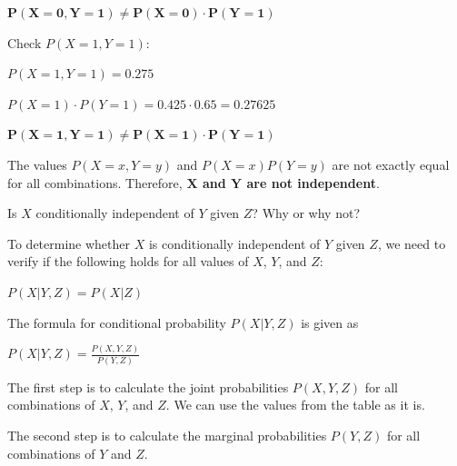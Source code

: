 \documentclass[12pt,letterpaper, onecolumn]{exam}
\begin{document}
\begin{questions}
\begin{parts}
\begin{subparts}
\begin{solution}
\begin{center}
                    $\boldsymbol{P(X=0,Y=1) \neq P(X=0) \cdot P(Y=1)}$
                \end{center}

                Check $P(X=1,Y=1)$:

                \begin{center}
                    $P(X=1,Y=1) = 0.275$

                    $P(X=1) \cdot P(Y=1) = 0.425 \cdot 0.65 = 0.27625$

                    $\boldsymbol{P(X=1,Y=1) \neq P(X=1) \cdot P(Y=1)}$
                \end{center}

                The values $P(X=x,Y=y)$ and $P(X=x)P(Y=y)$ are not exactly equal for all combinations. 
                Therefore, \textbf{$\boldsymbol{X}$ and $\textbf{Y}$ are not independent}.
                
            \end{solution}

            \pagebreak

            \subpart[5]
            Is $X$ conditionally independent of $Y$ given $Z$? Why or why not?
    
            \begin{solution}
                To determine whether $X$ is conditionally independent of $Y$ given 
                $Z$, we need to verify if the following holds for all values of 
                $X$, $Y$, and $Z$:
                
                \begin{center}
                    $\displaystyle{P(X|Y,Z) = P(X|Z)}$
                \end{center}

                The formula for conditional probability $P(X|Y,Z)$ is given as

                \begin{center}
                    $\displaystyle{P(X|Y,Z) = \frac{P(X,Y,Z)}{P(Y,Z)}}$
                \end{center}

                The first step is to calculate the joint probabilities $P(X,Y,Z)$ for all combinations of $X$, $Y$, and $Z$.
                We can use the values from the table as it is.

                The second step is to calculate the marginal probabilities $P(Y,Z)$ for all combinations of $Y$ and $Z$.


\end{solution}
\end{subparts}
\end{parts}
\end{questions}
\end{document}
